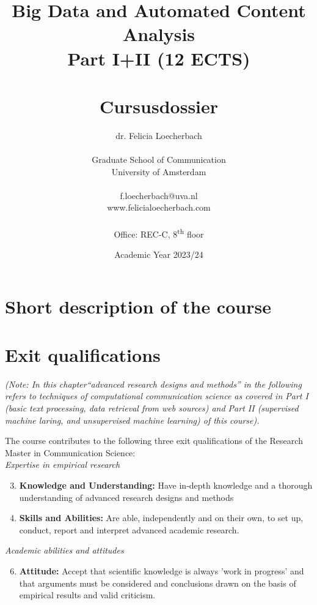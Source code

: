 \documentclass[a4paper,12pt]{report}
\title{Big Data and Automated Content Analysis\\ Part I+II (12 ECTS)\\~\\Cursusdossier}
\author{dr. Felicia Loecherbach\\~\\Graduate School of Communication\\University of Amsterdam\\~\\f.loecherbach@uva.nl\\www.felicialoecherbach.com\\~\\Office: REC-C, 8\textsuperscript{th} floor}
\date{Academic Year 2023/24}
\begin{document}
\maketitle

\tableofcontents


\chapter{Short description of the course}



\chapter{Exit qualifications}


\emph{(Note: In this chapter``advanced research designs and methods'' in the following refers to techniques of computational communication science as covered in Part I (basic text processing, data retrieval from web sources) and Part II (supervised machine laring, and unsupervised machine learning) of this course).}


The course contributes to the following three exit qualifications of the Research Master in Communication Science:\\


\noindent\textit{Expertise in empirical research}
\begin{enumerate}
	\setcounter{enumi}{2}
	\item{\textbf{Knowledge and Understanding:} Have in-depth knowledge and a thorough understanding of advanced research designs and methods} 
	\item{\textbf{Skills and Abilities:} Are able, independently and on their own, to set up, conduct, report and interpret advanced academic research.}
\end{enumerate}	

\noindent\textit{Academic abilities and attitudes}
\begin{enumerate}
	\setcounter{enumi}{5}
	\item{\textbf{Attitude:} Accept that scientific knowledge is always 'work in progress' and that arguments must be considered and conclusions drawn on the basis of empirical results and valid criticism.}
\end{enumerate}	
\end{document}
